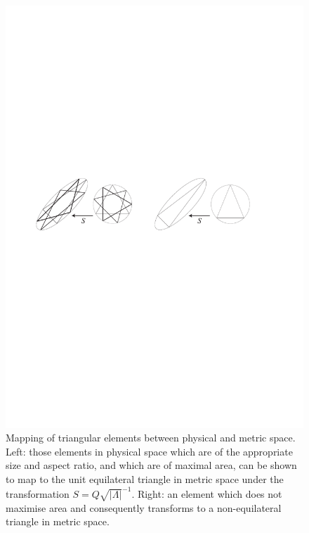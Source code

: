 \begin{figure}
\centering
\includegraphics[width=12cm]{images/Transformed_Elements.pdf}
\caption{Mapping of triangular elements between physical and metric
  space.  Left: those elements in physical space which are of the
  appropriate size and aspect ratio, and which are of maximal area,
  can be shown to map to the unit equilateral triangle in metric space
  under the transformation $S=Q\sqrt{|\Lambda|}^{-1}$.  Right: an
  element which does not maximise area and consequently transforms to
  a non-equilateral triangle in metric space.}
\label{Fig:Transformed_Elements}
\end{figure}

